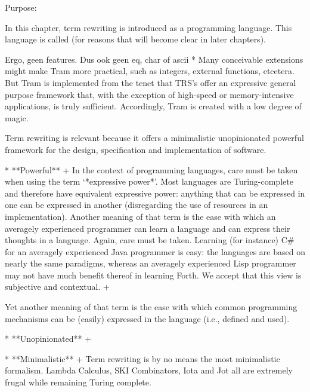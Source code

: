 \documentclass[11pt,twoside]{memoir}
\newcommand{\D}[1]{\index{#1}\defn{#1}}
\begin{document}
Purpose: 





In this chapter, term rewriting is introduced as a programming language. This language is called \D{Tram} (for reasons that will become clear in later chapters).



 Ergo, geen features. Dus ook geen eq, char of ascii
* Many conceivable extensions might make Tram more practical, such as integers, external functions, etcetera. But Tram is implemented from the tenet that TRS's offer an expressive general purpose framework that, with the exception of high-speed or memory-intensive applications, is truly sufficient. Accordingly, Tram is created with a low degree of magic.





Term rewriting is relevant because it offers a minimalistic unopinionated powerful framework for the design, specification and implementation of software. 

* **Powerful** +
In the context of programming languages, care must be taken when using the term `*expressive power*'. Most languages are Turing-complete and therefore have equivalent expressive power: anything that can be expressed in one can be expressed in another (disregarding the use of resources in an implementation). Another meaning of that term is the ease with which an averagely experienced programmer can learn a language and can express their thoughts in a language. Again, care must be taken. Learning (for instance) C\# for an averagely experienced Java programmer is easy: the languages are based on nearly the same paradigms, whereas an averagely experienced Lisp programmer may not have much benefit thereof in learning Forth. We accept that this view is subjective and contextual. +

Yet another meaning of that term is the ease with which common programming mechanisms can be (easily) expressed in the language (i.e., defined and used).

* **Unopinionated** +


* **Minimalistic** +
Term rewriting is by no means the most minimalistic formalism. Lambda Calculus, SKI Combinators, Iota and Jot all are extremely frugal while remaining Turing complete. 
\end{document}
